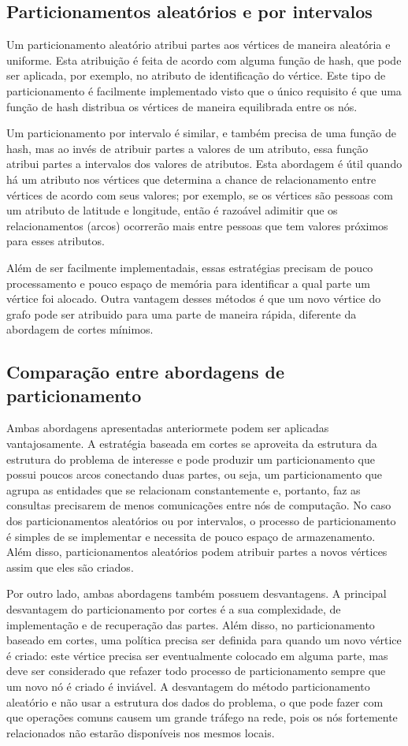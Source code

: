 \documentclass[conference]{IEEEtran}
\begin{document}
\subsection{Particionamentos aleatórios e por intervalos}
Um particionamento aleatório atribui partes aos vértices de maneira
aleatória e uniforme. Esta atribuição é feita de acordo com alguma
função de hash, que pode ser aplicada, por exemplo, no atributo
de identificação do vértice. Este tipo de particionamento é facilmente
implementado visto que o único requisito é que uma função de hash
distribua os vértices de maneira equilibrada entre os nós.

Um particionamento por intervalo é similar, e também precisa de uma
função de hash, mas ao invés de atribuir partes a valores de um
atributo, essa função atribui partes a intervalos dos valores de
atributos. Esta abordagem é útil quando há um atributo nos vértices que
determina a chance de relacionamento entre vértices de acordo com
seus valores; por exemplo, se os vértices são pessoas com um atributo
de latitude e longitude, então é razoável adimitir que os
relacionamentos (arcos) ocorrerão mais entre pessoas que tem valores
próximos para esses atributos.

Além de ser facilmente implementadais, essas estratégias precisam de
pouco processamento e pouco espaço de memória para identificar a qual
parte um vértice foi alocado. Outra vantagem desses métodos é que um
novo vértice do grafo pode ser atribuido para uma parte de maneira
rápida, diferente da abordagem de cortes mínimos.

\subsection{Comparação entre abordagens de particionamento}
Ambas abordagens apresentadas anteriormete podem ser aplicadas
vantajosamente. A estratégia baseada em cortes se aproveita da estrutura
da estrutura do problema de interesse e pode produzir um particionamento
que possui poucos arcos conectando duas partes, ou seja, um
particionamento que agrupa as entidades que se relacionam constantemente
e, portanto, faz as consultas precisarem de menos comunicações entre
nós de computação. No caso dos particionamentos aleatórios ou por
intervalos, o processo de particionamento é simples de se implementar
e necessita de pouco espaço de armazenamento. Além disso,
particionamentos aleatórios podem atribuir partes a novos vértices assim
que eles são criados.

Por outro lado, ambas abordagens também possuem desvantagens. A
principal desvantagem do particionamento por cortes é a sua
complexidade, de implementação e de recuperação das partes. Além disso,
no particionamento baseado em cortes, uma política precisa ser definida
para quando um novo vértice é criado: este vértice precisa ser
eventualmente colocado em alguma parte, mas deve ser considerado que
refazer todo processo de particionamento sempre que um novo nó é criado
é inviável. A desvantagem do método particionamento aleatório e não
usar a estrutura dos dados do problema, o que pode fazer com que
operações comuns causem um grande tráfego na rede, pois os nós
fortemente relacionados não estarão disponíveis nos mesmos locais.
\end{document}
